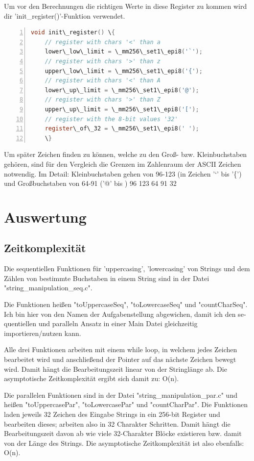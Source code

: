\documentclass[plainarticle,zihtitle,german,final,hyperref,utf8]{zihpub}
\begin{document}
Um vor den Berechnungen die richtigen Werte in diese Register zu kommen wird dir 'init\_register()'-Funktion verwendet.

\begin{lstlisting}[language=c, numbers=left]
void init\_register() \{
	// register with chars '<' than a
	lower\_low\_limit = \_mm256\_set1\_epi8('`');
	// register with chars '>' than z
	upper\_low\_limit = \_mm256\_set1\_epi8('{');
	// register with chars '<' than A
	lower\_up\_limit = \_mm256\_set1\_epi8('@');
	// register with chars '>' than Z
	upper\_up\_limit = \_mm256\_set1\_epi8('[');
	// register with the 8-bit values '32'
	register\_of\_32 = \_mm256\_set1\_epi8(' ');
	\}
\end{lstlisting}

Um später Zeichen finden zu können, welche zu den Groß- bzw. Kleinbuchstaben gehören, sind für den Vergleich die Grenzen im Zahlenraum der ASCII Zeichen notwendig. Im Detail: Kleinbuchstaben gehen von 96-123 (in Zeichen '`' bis '\{') und Großbuchstaben von 64-91 ('@' bis )
96
123
64
91
32



\section{Auswertung}
\subsection{Zeitkomplexität}
Die se­quen­ti­ellen Funktionen für 'uppercasing', 'lowercasing' von Strings und dem Zählen von bestimmte Buchstaben in einem String sind in der Datei "string\_manipulation\_seq.c".

Die Funktionen heißen "toUppercaseSeq", "toLowercaseSeq" und "countCharSeq". Ich bin hier von den Namen der Aufgabenstellung abgewichen, damit ich den se­quen­ti­ellen und paralleln Ansatz in einer Main Datei gleichzeitig importieren/nutzen kann.

Alle drei Funktionen arbeiten mit einem while loop, in welchem jedes Zeichen bearbeitet wird und anschließend der Pointer auf das nächste Zeichen bewegt wird. Damit hängt die Bearbeitungszeit linear von der Stringlänge ab. Die asymptotische Zeitkomplexität ergibt sich damit zu: O(n).
\newline

Die parallelen Funktionen sind in der Datei "string\_manipulation\_par.c" und heißen "toUppercasePar", "toLowercasePar" und "countCharPar".
Die Funktionen laden jeweils 32 Zeichen des Eingabe Strings in ein 256-bit Register und bearbeiten dieses; arbeiten also in 32 Charakter Schritten.
Damit hängt die Bearbeitungszeit davon ab wie viele 32-Charakter Blöcke existieren bzw. damit von der Länge des Strings. Die asymptotische Zeitkomplexität ist also ebenfalls: O(n).
\newline
\end{document}
